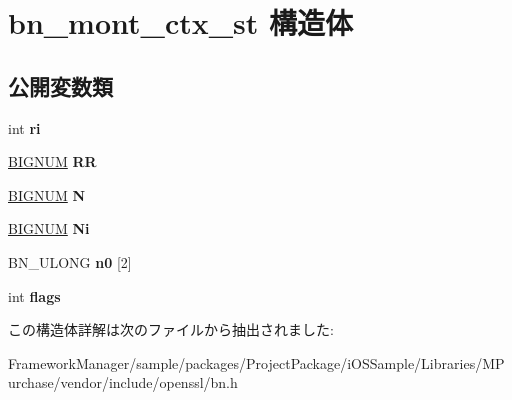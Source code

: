 \hypertarget{structbn__mont__ctx__st}{}\section{bn\+\_\+mont\+\_\+ctx\+\_\+st 構造体}
\label{structbn__mont__ctx__st}
\subsection*{公開変数類}
\begin{DoxyCompactItemize}
\item 
\hypertarget{structbn__mont__ctx__st_a62ed733165c48fa02734f7374b81dbe3}{}int {\bfseries ri}\label{structbn__mont__ctx__st_a62ed733165c48fa02734f7374b81dbe3}

\item 
\hypertarget{structbn__mont__ctx__st_a80618d14450f431dfbd94cf22f603dda}{}\hyperlink{structbignum__st}{B\+I\+G\+N\+U\+M} {\bfseries R\+R}\label{structbn__mont__ctx__st_a80618d14450f431dfbd94cf22f603dda}

\item 
\hypertarget{structbn__mont__ctx__st_ab39e1c073bfde3c58c515d52f129e5fb}{}\hyperlink{structbignum__st}{B\+I\+G\+N\+U\+M} {\bfseries N}\label{structbn__mont__ctx__st_ab39e1c073bfde3c58c515d52f129e5fb}

\item 
\hypertarget{structbn__mont__ctx__st_addf9ef45809c717971be3b8b724db8cd}{}\hyperlink{structbignum__st}{B\+I\+G\+N\+U\+M} {\bfseries Ni}\label{structbn__mont__ctx__st_addf9ef45809c717971be3b8b724db8cd}

\item 
\hypertarget{structbn__mont__ctx__st_a728405e4c4ef9cf589c09b42afe109e0}{}B\+N\+\_\+\+U\+L\+O\+N\+G {\bfseries n0} \mbox{[}2\mbox{]}\label{structbn__mont__ctx__st_a728405e4c4ef9cf589c09b42afe109e0}

\item 
\hypertarget{structbn__mont__ctx__st_a8b43cc0971930aacb1fb2188e610dc8c}{}int {\bfseries flags}\label{structbn__mont__ctx__st_a8b43cc0971930aacb1fb2188e610dc8c}

\end{DoxyCompactItemize}


この構造体詳解は次のファイルから抽出されました\+:\begin{DoxyCompactItemize}
\item 
Framework\+Manager/sample/packages/\+Project\+Package/i\+O\+S\+Sample/\+Libraries/\+M\+Purchase/vendor/include/openssl/bn.\+h\end{DoxyCompactItemize}
